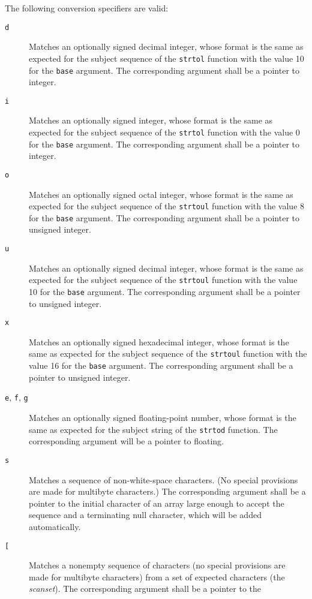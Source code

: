 The following conversion specifiers are valid:

\begin{description}
	\item[\texttt{d}] Matches an optionally signed decimal integer, whose
format is the same as expected for the subject sequence of the \texttt{strtol}
function with the value 10 for the \texttt{base} argument. The corresponding
argument shall be a pointer to integer.
	\item[\texttt{i}] Matches an optionally signed integer, whose format is the
same as expected for the subject sequence of the \texttt{strtol} function with
the value 0 for the \texttt{base} argument. The corresponding argument shall be
a pointer to integer.
	\item[\texttt{o}] Matches an optionally signed octal integer, whose format
is the same as expected for the subject sequence of the \texttt{strtoul}
function with the value 8 for the \texttt{base} argument. The corresponding
argument shall be a pointer to unsigned integer.
	\item[\texttt{u}] Matches an optionally signed decimal integer, whose
format is the same as expected for the subject sequence of the \texttt{strtoul}
function with the value 10 for the \texttt{base} argument. The corresponding
argument shall be a pointer to unsigned integer.
	\item[\texttt{x}] Matches an optionally signed hexadecimal integer, whose
format is the same as expected for the subject sequence of the \texttt{strtoul}
function with the value 16 for the \texttt{base} argument. The corresponding
argument shall be a pointer to unsigned integer.
	\item[\texttt{e}, \texttt{f}, \texttt{g}] Matches an optionally signed
floating-point number, whose format is the same as expected for the subject
string of the \texttt{strtod} function. The corresponding argument will be a
pointer to floating.
	\item[\texttt{s}] Matches a sequence of non-white-space characters. (No
special provisions are made for multibyte characters.) The corresponding
argument shall be a pointer to the initial character of an array large enough
to accept the sequence and a terminating null character, which will be added
automatically.
	\item[\texttt{[}] Matches a nonempty sequence of characters (no special
provisions are made for multibyte characters) from a set of expected characters
(the \emph{scanset}). The corresponding argument shall be a pointer to the

\end{description}
